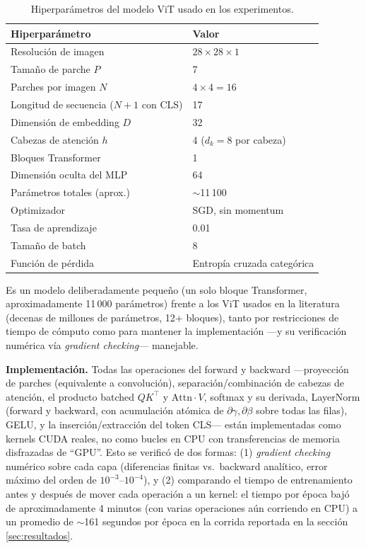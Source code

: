 \documentclass[11pt,a4paper]{article}
\begin{document}
\begin{table}[h]
\centering
\begin{tabular}{ll}
\toprule
\textbf{Hiperparámetro} & \textbf{Valor} \\
\midrule
Resolución de imagen & $28 \times 28 \times 1$ \\
Tamaño de parche $P$ & 7 \\
Parches por imagen $N$ & $4 \times 4 = 16$ \\
Longitud de secuencia ($N+1$ con CLS) & 17 \\
Dimensión de embedding $D$ & 32 \\
Cabezas de atención $h$ & 4 ($d_k = 8$ por cabeza) \\
Bloques Transformer & 1 \\
Dimensión oculta del MLP & 64 \\
Parámetros totales (aprox.) & $\sim$11\,100 \\
Optimizador & SGD, sin momentum \\
Tasa de aprendizaje & 0.01 \\
Tamaño de batch & 8 \\
Función de pérdida & Entropía cruzada categórica \\
\bottomrule
\end{tabular}
\caption{Hiperparámetros del modelo ViT usado en los experimentos.}
\label{tab:hparams}
\end{table}

Es un modelo deliberadamente pequeño (un solo bloque Transformer,
aproximadamente 11\,000 parámetros) frente a los ViT usados en la
literatura (decenas de millones de parámetros, 12+ bloques), tanto por
restricciones de tiempo de cómputo como para mantener la implementación
---y su verificación numérica vía \emph{gradient checking}--- manejable.

\textbf{Implementación.} Todas las operaciones del forward y backward
---proyección de parches (equivalente a convolución), separación/combinación
de cabezas de atención, el producto batched $QK^\top$ y
$\mathrm{Attn}\cdot V$, softmax y su derivada, LayerNorm (forward y
backward, con acumulación atómica de $\partial\gamma,\partial\beta$ sobre
todas las filas), GELU, y la inserción/extracción del token CLS--- están
implementadas como kernels CUDA reales, no como bucles en CPU con
transferencias de memoria disfrazadas de ``GPU''. Esto se verificó de dos
formas: (1) \emph{gradient checking} numérico sobre cada capa (diferencias
finitas vs.\ backward analítico, error máximo del orden de
$10^{-3}$--$10^{-4}$), y (2) comparando el tiempo de entrenamiento antes y
después de mover cada operación a un kernel: el tiempo por época bajó de
aproximadamente 4 minutos (con varias operaciones aún corriendo en CPU) a
un promedio de $\sim$161 segundos por época en la corrida reportada en la
sección \ref{sec:resultados}.
\end{document}
